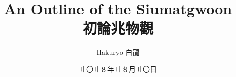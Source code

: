\documentclass[9pt]{article}
\title{An Outline of the Siumatgwoon \\ 初論兆物觀}
\author{Hakuryo 白龍}
\date{〢〇〢〥年〢〥月〢〇日}
\begin{document}
\sloppy

\jcz{}


\maketitle

\end{document}
